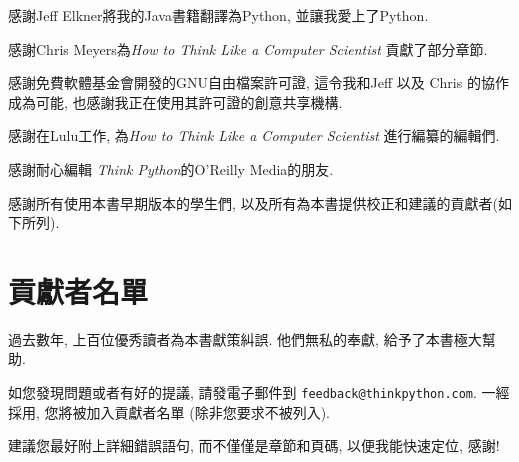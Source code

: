 \documentclass[10pt]{book}
\begin{document}
感謝Jeff Elkner將我的Java書籍翻譯為Python, 
並讓我愛上了Python.

感謝Chris Meyers為{\em How to Think Like a Computer Scientist}
貢獻了部分章節. 


感謝免費軟體基金會開發的GNU自由檔案許可證, 
這令我和Jeff 以及 Chris 的協作成為可能,
也感謝我正在使用其許可證的創意共享機構. 


感謝在Lulu工作, 為{\em How to Think Like a Computer Scientist}
進行編纂的編輯們. 

感謝耐心編輯 {\em Think Python}的O'Reilly Media的朋友. 

感謝所有使用本書早期版本的學生們, 以及所有為本書提供校正和建議的貢獻者(如下所列). 


\section*{貢獻者名單}

過去數年, 上百位優秀讀者為本書獻策糾誤. 
他們無私的奉獻, 給予了本書極大幫助. 

如您發現問題或者有好的提議, 請發電子郵件到 
{\tt feedback@thinkpython.com}. 一經採用, 您將被加入貢獻者名單
(除非您要求不被列入).

建議您最好附上詳細錯誤語句, 而不僅僅是章節和頁碼, 以便我能快速定位, 感謝!
\end{document}

